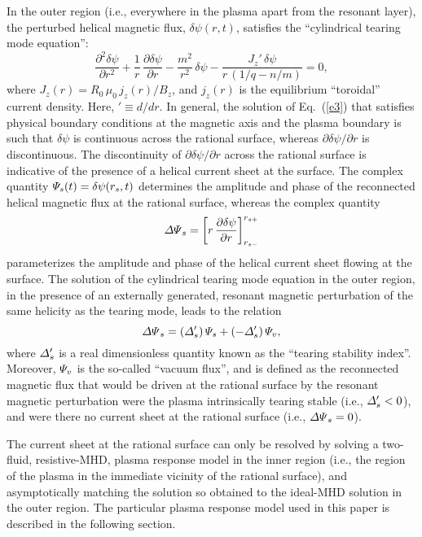 \documentclass[12pt,prb,aps]{revtex4-1}
\begin{document}
In the outer region  (i.e., everywhere in the plasma
apart from the resonant layer), the perturbed helical magnetic flux, $\delta\psi(r,t)$, satisfies the
``cylindrical tearing mode equation'':\,\cite{wes}
\begin{equation}\label{e3}
\frac{\partial^2\delta\psi}{\partial r^2} + \frac{1}{r}\,\frac{\partial\delta\psi}{\partial r}-\frac{m^2}{r^2}\,\delta\psi - \frac{J_z'\,\delta\psi}{r\,(1/q-n/m)}=  0,
\end{equation}
where 
$J_z(r)= R_0\,\mu_0\,j_z(r)/B_z$,
and $j_z(r)$ is the equilibrium ``toroidal'' current density. Here, $'\equiv d/dr$. In general, the solution of Eq.~(\ref{e3}) that satisfies physical
boundary conditions at the magnetic axis and the plasma boundary is such that $\delta\psi$ is continuous
across the rational surface, whereas $\partial\delta\psi/\partial r$ is discontinuous. The discontinuity of
 $\partial\delta\psi/\partial r$ across the rational surface is indicative of the presence of a helical current
 sheet at the surface.  The complex quantity ${\mit\Psi}_s(t)= \delta\psi(r_s,t)$ determines the amplitude
 and phase of the reconnected helical magnetic flux at the rational surface, whereas the complex quantity\,\cite{rf1993}
 \begin{equation}
{\mit\Delta\Psi}_s = \left[r\,\frac{\partial \delta\psi}{\partial r}\right]_{r_{s-}}^{r_{s+}}
\end{equation}
parameterizes the amplitude and phase of the helical current sheet flowing at the surface. The solution of
the cylindrical tearing mode equation in the outer region, in the presence of an externally generated, resonant magnetic perturbation 
of the same helicity as the tearing mode, leads to the relation\,\cite{rf1993,fkr}
\begin{equation}\label{e110}
{\mit\Delta\Psi}_s= ({\mit\Delta}_s')\,{\mit\Psi}_s + (-{\mit\Delta}_s')\,{\mit\Psi}_v,
\end{equation}
where ${\mit\Delta}_s'$ is a real dimensionless quantity known as the ``tearing stability index''. Moreover,
${\mit\Psi}_v$ is the so-called ``vacuum flux'', and is defined as the reconnected magnetic flux
that would be driven at the rational surface by the resonant magnetic perturbation were the
plasma intrinsically tearing stable (i.e., ${\mit\Delta}_s' <0$), and were there no current sheet at the rational surface
(i.e., ${\mit\Delta\Psi}_s=0$).

The current sheet at the rational surface can only be resolved by solving  a two-fluid, resistive-MHD, plasma response model
in the  inner region (i.e., the region of the plasma in the immediate vicinity of the rational surface), 
and asymptotically matching the solution so obtained to the ideal-MHD solution in the outer region. The particular 
plasma response model used in this paper is
described in the following section. 
\end{document}
